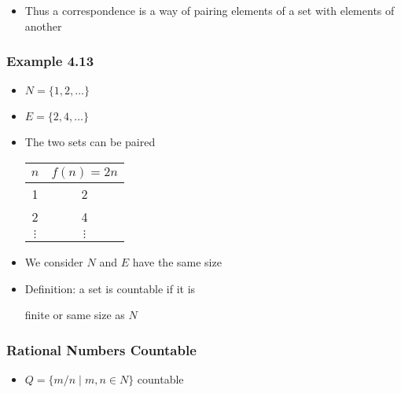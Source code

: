 \begin{frame}[allowframebreaks]
\begin{itemize}
\begin{center}
\end{center}
\item Thus a correspondence is a way of pairing elements of a set with
elements of another
\end{itemize}\end{frame} \begin{frame}[allowframebreaks] \frametitle{Example 4.13}
  \begin{itemize}
\item $N=\{1,2,\ldots\}$
\item $E=\{2,4,\ldots\}$
\item The two sets can be paired
  \begin{center}
    \begin{tabular}{cc}
$n$ & $f(n)=2n$\\ \hline
1 & 2 \\
2 & 4 \\
$\vdots$ & $\vdots$
    \end{tabular}
  \end{center}
\item We consider $N$ and $E$ have \alert{the same size}
\item Definition: a set is countable if it is 
  \begin{center}
finite or same size as $N$
\end{center}
\end{itemize}\end{frame} \begin{frame}[allowframebreaks] \frametitle{Rational Numbers Countable}
  \begin{itemize}
\item $Q=\{m/n
\mid m,n \in N\}$ countable



\end{itemize}
\end{frame}
